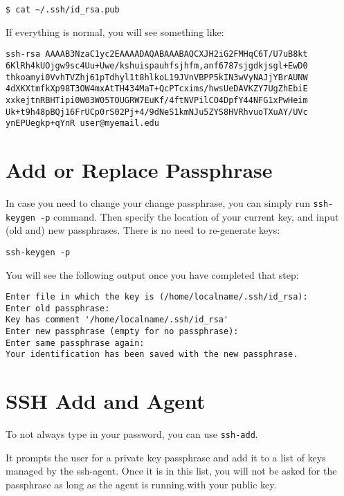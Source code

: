 \begin{verbatim}
$ cat ~/.ssh/id_rsa.pub
\end{verbatim}

If everything is normal, you will see something like:

\begin{verbatim}
ssh-rsa AAAAB3NzaC1yc2EAAAADAQABAAABAQCXJH2iG2FMHqC6T/U7uB8kt
6KlRh4kUOjgw9sc4Uu+Uwe/kshuispauhfsjhfm,anf6787sjgdkjsgl+EwD0
thkoamyi0VvhTVZhj61pTdhyl1t8hlkoL19JVnVBPP5kIN3wVyNAJjYBrAUNW
4dXKXtmfkXp98T3OW4mxAtTH434MaT+QcPTcxims/hwsUeDAVKZY7UgZhEbiE
xxkejtnRBHTipi0W03W05TOUGRW7EuKf/4ftNVPilCO4DpfY44NFG1xPwHeim
Uk+t9h48pBQj16FrUCp0rS02Pj+4/9dNeS1kmNJu5ZYS8HVRhvuoTXuAY/UVc
ynEPUegkp+qYnR user@myemail.edu
\end{verbatim}

\section{Add or Replace Passphrase}

In case you need to change your change passphrase, you can simply run
\verb|ssh-keygen -p| command. Then specify the location of your current
key, and input (old and) new passphrases. There is no need to
re-generate keys:

\begin{verbatim}
ssh-keygen -p
\end{verbatim}

You will see the following output once you have completed that step:

\begin{verbatim}
Enter file in which the key is (/home/localname/.ssh/id_rsa):
Enter old passphrase:
Key has comment '/home/localname/.ssh/id_rsa'
Enter new passphrase (empty for no passphrase):
Enter same passphrase again:
Your identification has been saved with the new passphrase.  
\end{verbatim}

\section{SSH Add and Agent}

To not always type in your password, you can use \verb|ssh-add|.

It prompts the user for a private key passphrase and add it to a list
of keys managed by the ssh-agent. Once it is in this list, you will
not be asked for the passphrase as long as the agent is running.with your public key.

